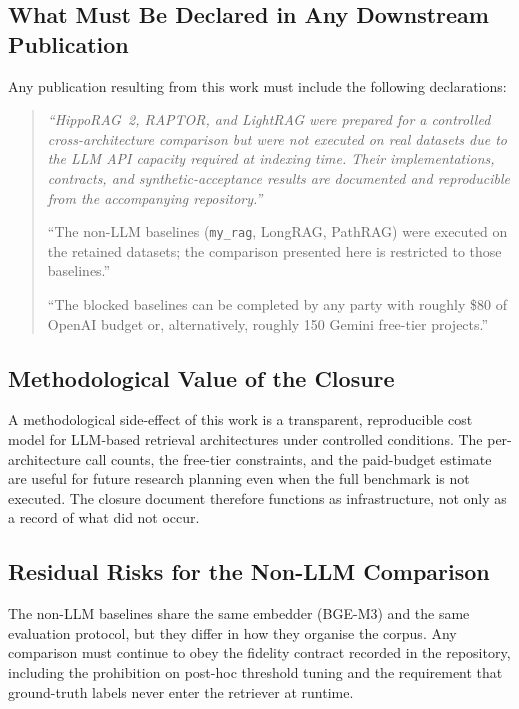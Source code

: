 \documentclass[11pt,a4paper]{article}
\begin{document}
\subsection{What Must Be Declared in Any Downstream Publication}

Any publication resulting from this work must include the following declarations:

\begin{quote}
\itshape
``HippoRAG~2, RAPTOR, and LightRAG were prepared for a controlled cross-architecture comparison but were not executed on real datasets due to the LLM API capacity required at indexing time. Their implementations, contracts, and synthetic-acceptance results are documented and reproducible from the accompanying repository.''

``The non-LLM baselines (\texttt{my\_rag}, LongRAG, PathRAG) were executed on the retained datasets; the comparison presented here is restricted to those baselines.''

``The blocked baselines can be completed by any party with roughly \$80 of OpenAI budget or, alternatively, roughly 150 Gemini free-tier projects.''
\end{quote}

\subsection{Methodological Value of the Closure}

A methodological side-effect of this work is a transparent, reproducible cost model for LLM-based retrieval architectures under controlled conditions. The per-architecture call counts, the free-tier constraints, and the paid-budget estimate are useful for future research planning even when the full benchmark is not executed. The closure document therefore functions as infrastructure, not only as a record of what did not occur.

\subsection{Residual Risks for the Non-LLM Comparison}

The non-LLM baselines share the same embedder (BGE-M3) and the same evaluation protocol, but they differ in how they organise the corpus. Any comparison must continue to obey the fidelity contract recorded in the repository, including the prohibition on post-hoc threshold tuning and the requirement that ground-truth labels never enter the retriever at runtime.
\end{document}

